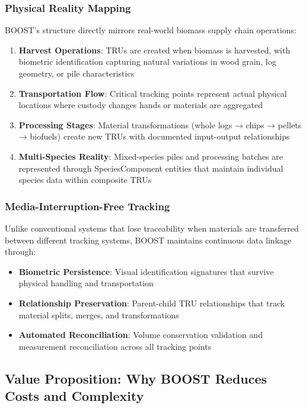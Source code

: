 \subsubsection{Physical Reality Mapping}

BOOST's structure directly mirrors real-world biomass supply chain operations:

\begin{enumerate}
\item \textbf{Harvest Operations}: TRUs are created when biomass is harvested, with biometric identification capturing natural variations in wood grain, log geometry, or pile characteristics
\item \textbf{Transportation Flow}: Critical tracking points represent actual physical locations where custody changes hands or materials are aggregated
\item \textbf{Processing Stages}: Material transformations (whole logs → chips → pellets → biofuels) create new TRUs with documented input-output relationships
\item \textbf{Multi-Species Reality}: Mixed-species piles and processing batches are represented through SpeciesComponent entities that maintain individual species data within composite TRUs
\end{enumerate}

\subsubsection{Media-Interruption-Free Tracking}

Unlike conventional systems that lose traceability when materials are transferred between different tracking systems, BOOST maintains continuous data linkage through:

\begin{itemize}
\item \textbf{Biometric Persistence}: Visual identification signatures that survive physical handling and transportation
\item \textbf{Relationship Preservation}: Parent-child TRU relationships that track material splits, merges, and transformations
\item \textbf{Automated Reconciliation}: Volume conservation validation and measurement reconciliation across all tracking points
\end{itemize}

\subsection{Value Proposition: Why BOOST Reduces Costs and Complexity}
\label{sec:value-proposition}

